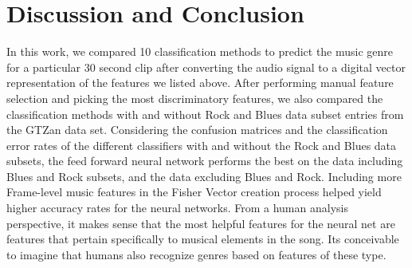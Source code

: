 \documentclass{article} %
\begin{document}

\section{Discussion and Conclusion}
In this work, we compared 10 classification methods to predict the music genre for a particular 30 second clip after converting the audio signal to a digital vector representation of the features we listed above. After performing manual feature selection and picking the most discriminatory features, we also compared the classification methods with and without Rock and Blues data subset entries from the GTZan data set. Considering the confusion matrices and the classification error rates of the different classifiers with and without the Rock and Blues data subsets, the feed forward neural network performs the best on the data including Blues and Rock subsets, and the data excluding Blues and Rock. Including more Frame-level music features in the Fisher Vector creation process helped yield higher accuracy rates for the neural networks. From a human analysis perspective, it makes sense that the most helpful features for the neural net are features that pertain specifically to musical elements in the song. Its conceivable to imagine that humans also recognize genres based on features of these type.
\end{document}
